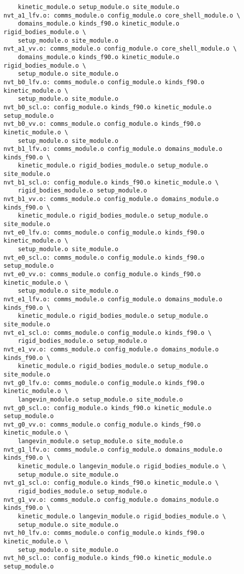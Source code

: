 \begin{verbatim}
	kinetic_module.o setup_module.o site_module.o
nvt_a1_lfv.o: comms_module.o config_module.o core_shell_module.o \
	domains_module.o kinds_f90.o kinetic_module.o rigid_bodies_module.o \
	setup_module.o site_module.o
nvt_a1_vv.o: comms_module.o config_module.o core_shell_module.o \
	domains_module.o kinds_f90.o kinetic_module.o rigid_bodies_module.o \
	setup_module.o site_module.o
nvt_b0_lfv.o: comms_module.o config_module.o kinds_f90.o kinetic_module.o \
	setup_module.o site_module.o
nvt_b0_scl.o: config_module.o kinds_f90.o kinetic_module.o setup_module.o
nvt_b0_vv.o: comms_module.o config_module.o kinds_f90.o kinetic_module.o \
	setup_module.o site_module.o
nvt_b1_lfv.o: comms_module.o config_module.o domains_module.o kinds_f90.o \
	kinetic_module.o rigid_bodies_module.o setup_module.o site_module.o
nvt_b1_scl.o: config_module.o kinds_f90.o kinetic_module.o \
	rigid_bodies_module.o setup_module.o
nvt_b1_vv.o: comms_module.o config_module.o domains_module.o kinds_f90.o \
	kinetic_module.o rigid_bodies_module.o setup_module.o site_module.o
nvt_e0_lfv.o: comms_module.o config_module.o kinds_f90.o kinetic_module.o \
	setup_module.o site_module.o
nvt_e0_scl.o: comms_module.o config_module.o kinds_f90.o setup_module.o
nvt_e0_vv.o: comms_module.o config_module.o kinds_f90.o kinetic_module.o \
	setup_module.o site_module.o
nvt_e1_lfv.o: comms_module.o config_module.o domains_module.o kinds_f90.o \
	kinetic_module.o rigid_bodies_module.o setup_module.o site_module.o
nvt_e1_scl.o: comms_module.o config_module.o kinds_f90.o \
	rigid_bodies_module.o setup_module.o
nvt_e1_vv.o: comms_module.o config_module.o domains_module.o kinds_f90.o \
	kinetic_module.o rigid_bodies_module.o setup_module.o site_module.o
nvt_g0_lfv.o: comms_module.o config_module.o kinds_f90.o kinetic_module.o \
	langevin_module.o setup_module.o site_module.o
nvt_g0_scl.o: config_module.o kinds_f90.o kinetic_module.o setup_module.o
nvt_g0_vv.o: comms_module.o config_module.o kinds_f90.o kinetic_module.o \
	langevin_module.o setup_module.o site_module.o
nvt_g1_lfv.o: comms_module.o config_module.o domains_module.o kinds_f90.o \
	kinetic_module.o langevin_module.o rigid_bodies_module.o \
	setup_module.o site_module.o
nvt_g1_scl.o: config_module.o kinds_f90.o kinetic_module.o \
	rigid_bodies_module.o setup_module.o
nvt_g1_vv.o: comms_module.o config_module.o domains_module.o kinds_f90.o \
	kinetic_module.o langevin_module.o rigid_bodies_module.o \
	setup_module.o site_module.o
nvt_h0_lfv.o: comms_module.o config_module.o kinds_f90.o kinetic_module.o \
	setup_module.o site_module.o
nvt_h0_scl.o: config_module.o kinds_f90.o kinetic_module.o setup_module.o

\end{verbatim}

